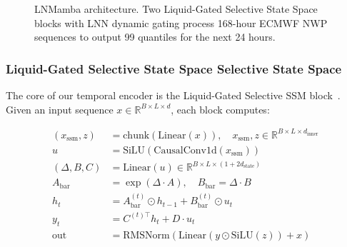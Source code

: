 \documentclass[review]{elsarticle}
\begin{document}
\begin{figure}[H]
\centering
{}
\caption{LNMamba architecture. Two Liquid-Gated Selective State Space blocks with LNN dynamic gating process 168-hour ECMWF NWP sequences to output 99 quantiles for the next 24 hours.}
\label{fig:arch}
\end{figure}

\subsubsection{Liquid-Gated Selective State Space Selective State Space}

The core of our temporal encoder is the Liquid-Gated Selective SSM block~\cite{dao2024transformers}. Given an input sequence $x \in \mathbb{R}^{B \times L \times d}$, each block computes:

\begin{equation}
\begin{aligned}
(x_{\text{ssm}}, z) &= \text{chunk}(\text{Linear}(x)), \quad x_{\text{ssm}}, z \in \mathbb{R}^{B \times L \times d_{\text{inner}}} \\
u &= \text{SiLU}(\text{CausalConv1d}(x_{\text{ssm}})) \\
(\Delta, B, C) &= \text{Linear}(u) \in \mathbb{R}^{B \times L \times (1 + 2d_{\text{state}})} \\
A_{\text{bar}} &= \exp(\Delta \cdot A), \quad B_{\text{bar}} = \Delta \cdot B \\
h_t &= A_{\text{bar}}^{(t)} \odot h_{t-1} + B_{\text{bar}}^{(t)} \odot u_t \\
y_t &= C^{(t)\top} h_t + D \cdot u_t \\
\text{out} &= \text{RMSNorm}(\text{Linear}(y \odot \text{SiLU}(z)) + x)
\end{aligned}
\end{equation}
\end{document}
